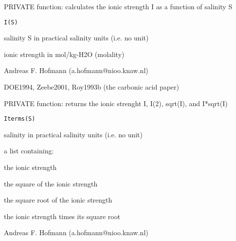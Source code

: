 \documentclass{article}
\begin{document}
\begin{Description}\relax
PRIVATE function: calculates the ionic strength I as a function of salinity S
\end{Description}
\begin{Usage}
\begin{verbatim}I(S)\end{verbatim}
\end{Usage}
\begin{Arguments}
\begin{ldescription}
\item[\code{S }] salinity S in practical salinity units (i.e. no unit)
\end{ldescription}
\end{Arguments}
\begin{Value}
ionic strength in mol/kg-H2O (molality)
\end{Value}
\begin{Author}\relax
Andreas F. Hofmann (a.hofmann@nioo.knaw.nl)
\end{Author}
\begin{References}\relax
DOE1994, Zeebe2001, Roy1993b (the carbonic acid paper)
\end{References}

\begin{Description}\relax
PRIVATE function: returns the ionic strenght I, I(2), sqrt(I), and I*sqrt(I)
\end{Description}
\begin{Usage}
\begin{verbatim}Iterms(S)\end{verbatim}
\end{Usage}
\begin{Arguments}
\begin{ldescription}
\item[\code{S }] salinity in practical salinity units (i.e. no unit)
\end{ldescription}
\end{Arguments}
\begin{Value}
a list containing:
\begin{ldescription}
\item[\code{I }] the ionic strength
\item[\code{I\textasciicircum{}2 }] the square of the ionic strength
\item[\code{sqrtI }] the square root of the ionic strength
\item[\code{I*sqrtI }] the ionic strength times its square root
\end{ldescription}
\end{Value}
\begin{Author}\relax
Andreas F. Hofmann (a.hofmann@nioo.knaw.nl)
\end{Author}
\end{document}
